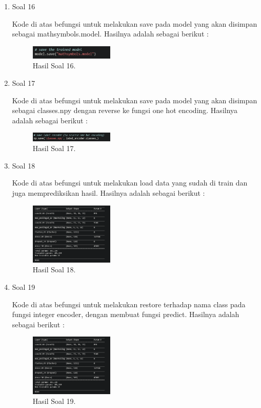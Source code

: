 \begin{enumerate}
	\item Soal 16
	\hfill\break
	
	Kode di atas befungsi untuk melakukan save pada model yang akan disimpan sebagai mathsymbols.model. Hasilnya adalah sebagai berikut :  
	\begin{figure}[H]
	\centering
		\includegraphics[width=4cm]{figures/1174080/7/materi/hasil16.PNG}
		\caption{Hasil Soal 16.}
	\end{figure}

	\item Soal 17
	\hfill\break
	
	Kode di atas befungsi untuk melakukan save pada model yang akan disimpan sebagai classes.npy dengan reverse ke fungsi one hot encoding. Hasilnya adalah sebagai berikut :  
	\begin{figure}[H]
	\centering
		\includegraphics[width=4cm]{figures/1174080/7/materi/hasil17.PNG}
		\caption{Hasil Soal 17.}
	\end{figure}

	\item Soal 18
	\hfill\break
	
	Kode di atas befungsi untuk melakukan load data yang sudah di train dan juga memprediksikan hasil. Hasilnya adalah sebagai berikut :  
	\begin{figure}[H]
	\centering
		\includegraphics[width=4cm]{figures/1174080/7/materi/hasil18.PNG}
		\caption{Hasil Soal 18.}
	\end{figure}

	\item Soal 19
	\hfill\break
	
	Kode di atas befungsi untuk melakukan restore terhadap nama class pada fungsi integer encoder, dengan membuat fungsi predict. Hasilnya adalah sebagai berikut :  
	\begin{figure}[H]
	\centering
		\includegraphics[width=4cm]{figures/1174080/7/materi/hasil19.PNG}
		\caption{Hasil Soal 19.}
	\end{figure}


\end{enumerate}
